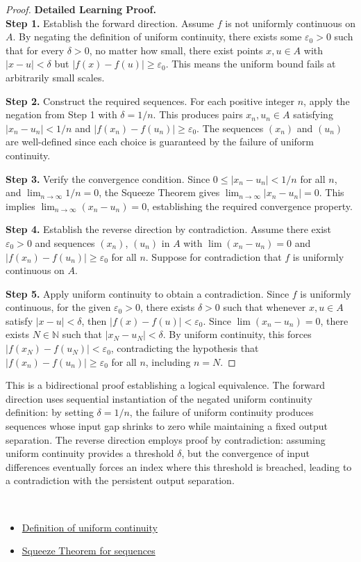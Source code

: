 \begin{proof}
\textbf{Detailed Learning Proof.}~\\

\textbf{Step 1.} Establish the forward direction. Assume $f$ is not uniformly continuous on $A$. By negating the definition of uniform continuity, there exists some $\varepsilon_0 > 0$ such that for every $\delta > 0$, no matter how small, there exist points $x, u \in A$ with $|x - u| < \delta$ but $|f(x) - f(u)| \geq \varepsilon_0$. This means the uniform bound fails at arbitrarily small scales.

\textbf{Step 2.} Construct the required sequences. For each positive integer $n$, apply the negation from Step 1 with $\delta = 1/n$. This produces pairs $x_n, u_n \in A$ satisfying $|x_n - u_n| < 1/n$ and $|f(x_n) - f(u_n)| \geq \varepsilon_0$. The sequences $(x_n)$ and $(u_n)$ are well-defined since each choice is guaranteed by the failure of uniform continuity.

\textbf{Step 3.} Verify the convergence condition. Since $0 \leq |x_n - u_n| < 1/n$ for all $n$, and $\lim_{n \to \infty} 1/n = 0$, the Squeeze Theorem gives $\lim_{n \to \infty} |x_n - u_n| = 0$. This implies $\lim_{n \to \infty} (x_n - u_n) = 0$, establishing the required convergence property.

\textbf{Step 4.} Establish the reverse direction by contradiction. Assume there exist $\varepsilon_0 > 0$ and sequences $(x_n)$, $(u_n)$ in $A$ with $\lim(x_n - u_n) = 0$ and $|f(x_n) - f(u_n)| \geq \varepsilon_0$ for all $n$. Suppose for contradiction that $f$ is uniformly continuous on $A$.

\textbf{Step 5.} Apply uniform continuity to obtain a contradiction. Since $f$ is uniformly continuous, for the given $\varepsilon_0 > 0$, there exists $\delta > 0$ such that whenever $x, u \in A$ satisfy $|x - u| < \delta$, then $|f(x) - f(u)| < \varepsilon_0$. Since $\lim(x_n - u_n) = 0$, there exists $N \in \mathbb{N}$ such that $|x_N - u_N| < \delta$. By uniform continuity, this forces $|f(x_N) - f(u_N)| < \varepsilon_0$, contradicting the hypothesis that $|f(x_n) - f(u_n)| \geq \varepsilon_0$ for all $n$, including $n = N$.
\end{proof}

\begin{remark*}
This is a bidirectional proof establishing a logical equivalence. The forward direction uses sequential instantiation of the negated uniform continuity definition: by setting $\delta = 1/n$, the failure of uniform continuity produces sequences whose input gap shrinks to zero while maintaining a fixed output separation. The reverse direction employs proof by contradiction: assuming uniform continuity provides a threshold $\delta$, but the convergence of input differences eventually forces an index where this threshold is breached, leading to a contradiction with the persistent output separation.
\end{remark*}

\begin{remark*}[Dependencies]~\\
\begin{itemize}
  \item \hyperref[def:uniform-continuity]{Definition of uniform continuity}
  \item \hyperref[thm:squeeze-theorem-sequences]{Squeeze Theorem for sequences}
\end{itemize}
\end{remark*}
